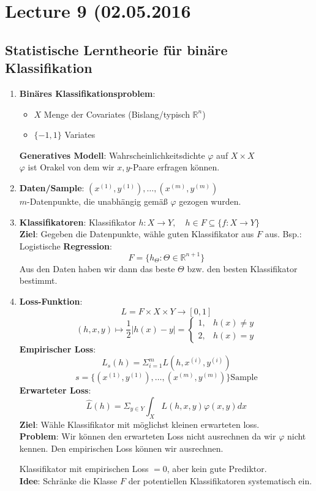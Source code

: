 \section*{Lecture 9 (02.05.2016}
\subsection*{Statistische Lerntheorie für binäre Klassifikation}

\begin{enumerate}[1.]

\item \textbf{Binäres Klassifikationsproblem}:

\begin{itemize}
\item $X$ Menge der Covariates (Bislang/typisch $\mathbb{R}^n$)
\item $\{-1,1\}$ Variates
\end{itemize}

\textbf{Generatives Modell}: Wahrscheinlichkeitsdichte $\varphi$ auf $X \times X$\\
$\varphi$ ist Orakel von dem wir $x, y$-Paare erfragen können.

\item \textbf{Daten/Sample}: $(x^{(1)},y^{(1)}) , \dots ,(x^{(m)}, y^{(m)})$\\
$m$-Datenpunkte, die unabhängig gemäß $\varphi$ gezogen wurden.

\item \textbf{Klassifikatoren}: Klassifikator $h: X \rightarrow Y, \quad h\in F \subseteq \{f: X \rightarrow Y\}$\\
\textbf{Ziel}: Gegeben die Datenpunkte, wähle guten Klassifikator aus $F$ aus. Bsp.: Logistische \textbf{Regression}:
\[F = \{h_\Theta: \Theta \in \mathbb{R}^{n+1}\}\]
Aus den Daten haben wir dann das beste $\Theta$ bzw. den besten Klassifikator bestimmt.
\item \textbf{Loss-Funktion}: 
\[L = F \times X \times Y \rightarrow [0,1]\]
\[(h,x,y) \mapsto \frac{1}{2} |h(x)-y| = \begin{cases}1,& h(x) \neq y \\2,& h(x) = y\end{cases}\]
\textbf{Empirischer Loss}:
\[L_s(h) = \Sigma_{i=1}^m L(h,x^{(i)},y^{(i)})\]
\[s = \{(x^{(1)}, y^{(1)}) , \dots ,(x^{(m)}, y^{(m)})\} \text{Sample}\]
\textbf{Erwarteter Loss}:
\[\hat{L}(h) = \Sigma_{y \in Y} \int_X L(h,x,y) \varphi(x,y) dx\]
\textbf{Ziel}: Wähle Klassifikator mit möglichst kleinen erwarteten loss.\\
\textbf{Problem}: Wir können den erwarteten Loss nicht ausrechnen da wir $\varphi$ nicht kennen. Den empirischen Loss können wir ausrechnen.


Klassifikator mit empirischen Loss $ = 0$, aber kein gute Prediktor.\\
\textbf{Idee}: Schränke die Klasse $F$ der potentiellen Klassifikatoren systematisch ein.

\end{enumerate}


